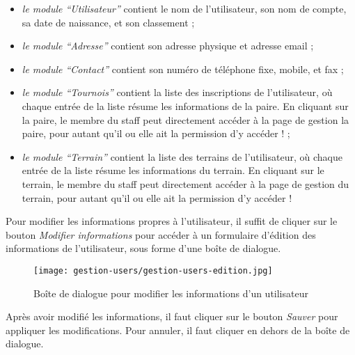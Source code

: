 \begin{itemize}
\item \textit{le module \enquote{Utilisateur}} contient le nom de l'utilisateur, son nom de compte, sa date de naissance, et son classement ;
\item \textit{le module \enquote{Adresse}} contient son adresse physique et adresse email ;
\item \textit{le module \enquote{Contact}} contient son numéro de téléphone fixe, mobile, et fax ;
\item \textit{le module \enquote{Tournois}} contient la liste des inscriptions de l'utilisateur, où chaque entrée de la liste résume les informations de la paire. En cliquant sur la paire, le membre du staff peut directement accéder à la page de gestion la paire, pour autant qu'il ou elle ait la permission d'y accéder ! ;
\item \textit{le module \enquote{Terrain}} contient la liste des terrains de l'utilisateur, où chaque entrée de la liste résume les informations du terrain. En cliquant sur le terrain, le membre du staff peut directement accéder à la page de gestion du terrain, pour autant qu'il ou elle ait la permission d'y accéder !
\end{itemize}
\bigskip

Pour modifier les informations propres à l'utilisateur, il suffit de cliquer sur le bouton \textit{Modifier informations} pour accéder à un formulaire d'édition des informations de l'utilisateur, sous forme d'une boîte de dialogue.

\begin{figure}[H]
\centering
\texttt{[image: gestion-users/gestion-users-edition.jpg]}
\caption{Boîte de dialogue pour modifier les informations d'un utilisateur}
\end{figure}

Après avoir modifié les informations, il faut cliquer sur le bouton \textit{Sauver} pour appliquer les modifications. Pour annuler, il faut cliquer en dehors de la boîte de dialogue.